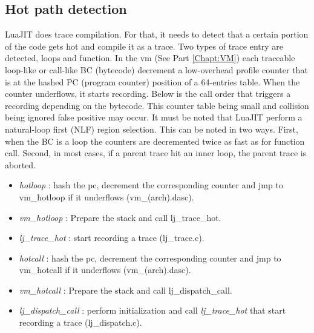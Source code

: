 

\subsection{Hot path detection}
\label{Subsec:hot-path}

LuaJIT does trace compilation. For that, it needs to detect that a certain
portion of the code gets hot and compile it as a trace. Two types of trace entry
are detected, loops and function. In the vm (See Part \ref{Chapt:VM}) each
traceable loop-like or call-like BC (bytecode) decrement a low-overhead profile
counter that is at the hashed PC (program counter) position of a 64-entries table.
When the counter underflows, it starts recording. Below is the call order that
triggers a recording depending on the bytecode. This counter table being small
and collision being ignored false positive may occur.
It must be noted that LuaJIT perform a natural-loop first (NLF) region selection.
This can be noted in two ways. First, when the BC is a loop the counters are
decremented twice as fast as for function call. Second, in most cases, if a
parent trace hit an inner loop, the parent trace is aborted.


\begin{itemize}
	\item \emph{hotloop} : hash the pc, decrement the corresponding counter and
jmp to vm\_hotloop if it underflows (vm\_(arch).dasc).
	\item \emph{vm\_hotloop} : Prepare the stack and call lj\_trace\_hot.
	\item \emph{lj\_trace\_hot} : start recording a trace (lj\_trace.c).
\end{itemize}


\begin{itemize}
	\item \emph{hotcall} : hash the pc, decrement the corresponding counter and
jmp to vm\_hotcall if it underflows (vm\_(arch).dasc).
	\item \emph{vm\_hotcall} : Prepare the stack and call lj\_dispatch\_call.
	\item \emph{lj\_dispatch\_call} : perform initialization
	and call \emph{lj\_trace\_hot} that start recording a trace (lj\_dispatch.c).
\end{itemize}

